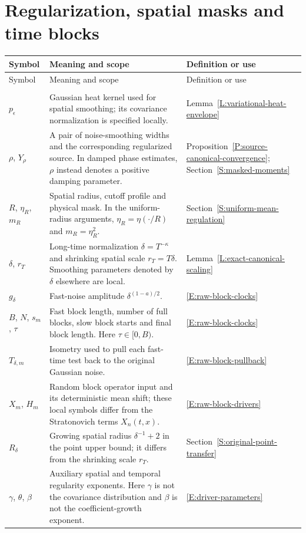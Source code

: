\section*{Regularization, spatial masks and time blocks}
\begin{longtable}{@{}>{\raggedright\arraybackslash}p{}
  >{\raggedright\arraybackslash}p{}
  >{\raggedright\arraybackslash}p{}@{}}
  \toprule
  Symbol & Meaning and scope & Definition or use \\
  \midrule
  \endfirsthead
  \toprule
  Symbol & Meaning and scope & Definition or use \\
  \midrule
  \endhead
  \midrule
  \multicolumn{3}{r}{\emph{Continued on the next page}} \\
  \endfoot
  \bottomrule
  \endlastfoot
  $p_\epsilon$ &
  Gaussian heat kernel used for spatial smoothing; its covariance normalization
  is specified locally. &
  Lemma~\ref{L:variational-heat-envelope} \\[5pt]
  $\rho$, $Y_\rho$ &
  A pair of noise-smoothing widths and the corresponding regularized source. In
  damped phase estimates, $\rho$ instead denotes a positive damping parameter. &
  Proposition~\ref{P:source-canonical-convergence};
  Section~\ref{S:masked-moments} \\[5pt]
  $R$, $\eta_R$, $m_R$ &
  Spatial radius, cutoff profile and physical mask. In the uniform-radius
  arguments, $\eta_R = \eta(\cdot/R)$ and $m_R = \eta_R^2$. &
  Section~\ref{S:uniform-mean-regulation} \\[5pt]
  $\delta$, $r_T$ &
  Long-time normalization $\delta = T^{-\kappa}$ and shrinking spatial scale
  $r_T = T\delta$. Smoothing parameters denoted by $\delta$ elsewhere are local.
  &
  Lemma~\ref{L:exact-canonical-scaling} \\[5pt]
  $g_\delta$ &
  Fast-noise amplitude $\delta^{(1 - a)/2}$. &
  \eqref{E:raw-block-clocks} \\[5pt]
  $B$, $N$, $s_m$, $\tau$ &
  Fast block length, number of full blocks, slow block starts and final block
  length. Here $\tau \in [0,B)$. &
  \eqref{E:raw-block-clocks} \\[5pt]
  $T_{\delta,m}$ &
  Isometry used to pull each fast-time test back to the original Gaussian noise.
  &
  \eqref{E:raw-block-pullback} \\[5pt]
  $X_m$, $H_m$ &
  Random block operator input and its deterministic mean shift; these local
  symbols differ from the Stratonovich terms $X_n(t,x)$. &
  \eqref{E:raw-block-drivers} \\[5pt]
  $R_\delta$ &
  Growing spatial radius $\delta^{-1} + 2$ in the point upper bound; it differs
  from the shrinking scale $r_T$. &
  Section~\ref{S:original-point-transfer} \\[5pt]
  $\gamma$, $\theta$, $\beta$ &
  Auxiliary spatial and temporal regularity exponents. Here $\gamma$ is not the
  covariance distribution and $\beta$ is not the coefficient-growth exponent. &
  \eqref{E:driver-parameters} \\[5pt]
\end{longtable}

